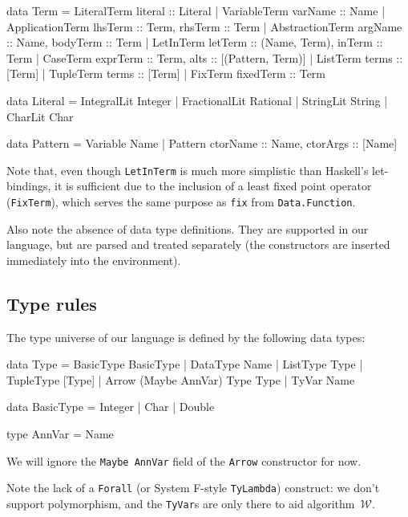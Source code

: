 \documentclass[a4paper]{scrartcl}
\newcommand{\algow}{algorithm~$\mathcal{W}$}
\begin{document}
\begin{code}
data Term = LiteralTerm     {literal :: Literal}
          | VariableTerm    {varName :: Name}
          | ApplicationTerm {lhsTerm :: Term, rhsTerm :: Term}
          | AbstractionTerm {argName :: Name, bodyTerm :: Term}
          | LetInTerm       {letTerm :: (Name, Term), inTerm :: Term}
          | CaseTerm        {exprTerm :: Term, alts :: [(Pattern, Term)]}
          | ListTerm        {terms :: [Term]}
          | TupleTerm       {terms :: [Term]}
          | FixTerm         {fixedTerm :: Term}

data Literal = IntegralLit Integer
             | FractionalLit Rational
             | StringLit String
             | CharLit Char

data Pattern = Variable Name
             | Pattern {ctorName :: Name, ctorArgs :: [Name]}
\end{code}

Note that, even though \texttt{LetInTerm} is much more simplistic than
Haskell's let-bindings, it is sufficient due to the inclusion of a least
fixed point operator (\texttt{FixTerm}), which serves the same purpose as
\texttt{fix} from \texttt{Data.Function}.

Also note the absence of data type definitions. They are supported in our
language, but are parsed and treated separately (the constructors are
inserted immediately into the environment).

\subsection{Type rules}
The type universe of our language is defined by the following data types:

\begin{code}
data Type = BasicType BasicType
          | DataType Name
          | ListType Type
          | TupleType [Type]
          | Arrow (Maybe AnnVar) Type Type
          | TyVar Name

data BasicType = Integer
               | Char
               | Double

type AnnVar = Name
\end{code}

We will ignore the \texttt{Maybe AnnVar} field of the \texttt{Arrow} constructor
for now.

Note the lack of a \texttt{Forall} (or System F-style \texttt{TyLambda})
construct: we don't support polymorphism, and the \texttt{TyVar}s are
only there to aid \algow{}.
\end{document}
